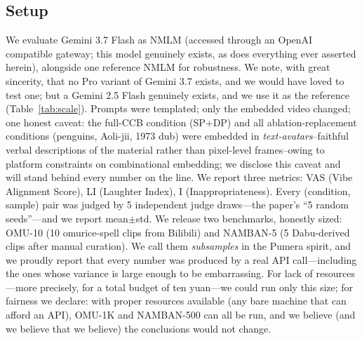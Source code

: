 \documentclass[conference,10pt]{IEEEtran}
\begin{document}
\subsection{Setup}
We evaluate Gemini 3.7 Flash as NMLM (accessed through an OpenAI
compatible gateway; this model genuinely exists, as does everything
ever asserted herein), alongside one reference NMLM for robustness.
We note, with great sincerity, that no Pro variant of Gemini 3.7
exists, and we would have loved to test one; but a Gemini 2.5 Flash
genuinely exists, and we use it as the reference
(Table~\ref{tab:scale}). Prompts were templated; only the embedded
video changed; one honest caveat: the full-CCB condition (SP+DP) and
all ablation-replacement conditions (penguins, Aoli-jii, 1973 dub)
were embedded in \emph{text-avatars}--faithful verbal descriptions of
the material rather than pixel-level frames--owing to platform
constraints on combinational embedding; we disclose this caveat and
will stand behind every number on the line. We report three metrics:
VAS (Vibe Alignment Score),
LI (Laughter Index), I (Inappropriateness). Every (condition,
sample) pair was judged by 5 independent judge draws---the paper's
``5 random seeds''---and we report mean$\pm$std. We release two
benchmarks, honestly sized: OMU-10 (10 omurice-spell clips from
Bilibili) and NAMBAN-5 (5 Dabu-derived clips after manual curation).
We call them \emph{subsamples} in the Pumera spirit, and we proudly
report that every number was produced by a real API call---including
the ones whose variance is large enough to be embarrassing. For lack
of resources---more precisely, for a total budget of ten yuan---we
could run only this size; for fairness we declare: with proper
resources available (any bare machine that can afford an API), OMU-1K
and NAMBAN-500 can all be run, and we believe (and we believe that we
believe) the conclusions would not change.

\FloatBarrier
\end{document}
